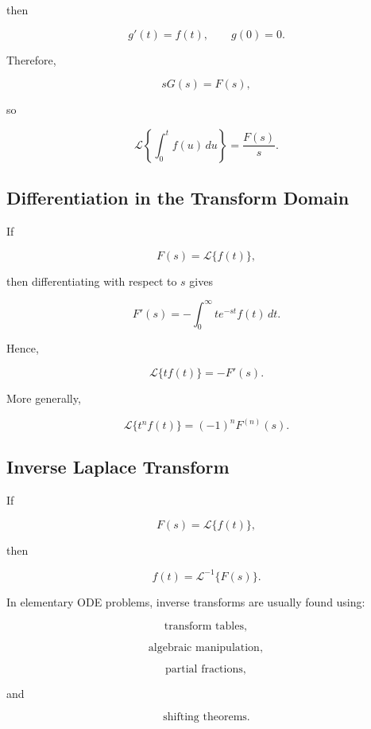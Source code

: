 then

\[
g'(t)=f(t),
\qquad
g(0)=0.
\]

Therefore,

\[
sG(s)=F(s),
\]

so

\[
\boxed{
\mathcal{L}
\left\{
\int_0^t
f(u)\,du
\right\}
=
\frac{
F(s)
}{
s
}.
}
\]

\subsection{Differentiation in the Transform Domain}
\label{subsec:differentiation-transform-domain}

If

\[
F(s)
=
\mathcal{L}\{f(t)\},
\]

then differentiating with respect to \(s\) gives

\[
F'(s)
=
-
\int_0^\infty
t e^{-st}f(t)\,dt.
\]

Hence,

\[
\boxed{
\mathcal{L}\{tf(t)\}
=
-
F'(s).
}
\]

More generally,

\[
\boxed{
\mathcal{L}\{t^nf(t)\}
=
(-1)^n
F^{(n)}(s).
}
\]

\subsection{Inverse Laplace Transform}
\label{subsec:inverse-laplace-transform}

If

\[
F(s)
=
\mathcal{L}\{f(t)\},
\]

then

\[
\boxed{
f(t)
=
\mathcal{L}^{-1}\{F(s)\}.
}
\]

In elementary ODE problems, inverse transforms are usually found using:

\[
\boxed{
\text{transform tables},
}
\]

\[
\boxed{
\text{algebraic manipulation},
}
\]

\[
\boxed{
\text{partial fractions},
}
\]

and

\[
\boxed{
\text{shifting theorems}.
}
\]

